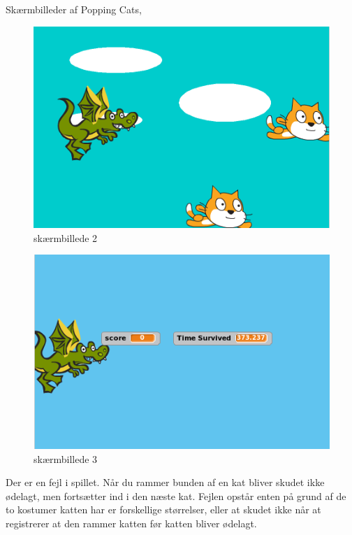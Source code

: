 \documentclass[a4paper]{article}
\begin{document}
Skærmbilleder af Popping Cats,\\
\begin{figure}[h]
	\centering
	\includegraphics[scale=0.3]{screen_game0.png}
	\caption{skærmbillede 2}
	\label{fig: skitse}
\end{figure}
\begin{figure}[h]
	\centering
	\includegraphics[scale=0.3]{screen_game1.png}
	\caption{skærmbillede 3}
	\label{fig: skitse}
\end{figure}


Der er en fejl i spillet. Når du rammer bunden af en kat bliver skudet ikke ødelagt, men fortsætter ind i den næste kat. Fejlen opstår enten på grund af de to kostumer katten har er forskellige størrelser, eller at skudet ikke når at registrerer at den rammer katten før katten bliver ødelagt.
\end{document}
